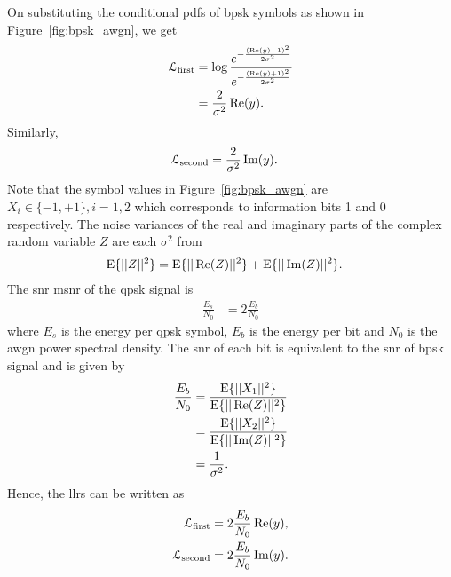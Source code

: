 On substituting the conditional \glspl{pdf} of \gls{bpsk} symbols as shown in Figure~\ref{fig:bpsk_awgn}, we get
\begin{align}
\mathcal{L}_{\text{first}}&=\log\frac{e^{-\frac{(\operatorname{Re}(y)-1)^2}{2\sigma^2}}}{e^{-\frac{(\operatorname{Re}(y)+1)^2}{2\sigma^2}}}\\
&=\frac{2}{\sigma^2}\operatorname{Re}(y)\label{eq:final_llr1}.
\end{align}
Similarly,
\begin{align}
\mathcal{L}_{\text{second}}&=\frac{2}{\sigma^2}\operatorname{Im}(y)\label{eq:final_llr2}.
\end{align}
Note that the symbol values in Figure~\ref{fig:bpsk_awgn} are $X_i\in\{-1,+1\},i=1,2$ which corresponds to information bits 1 and 0 respectively. The noise variances of the real and imaginary parts of the complex random variable $Z$ are each $\sigma^2$ from
\begin{align}
\text{E}\{||Z||^2\}&=\text{E}\{||\operatorname{Re}(Z)||^2\}+\text{E}\{||\operatorname{Im}(Z)||^2\}.
\end{align}
The \gls{snr} \gls{msnr} of the \gls{qpsk} signal is
\begin{align}
\frac{E_s}{N_0}&=2\frac{E_b}{N_0}
\end{align}
where $E_s$ is the energy per \gls{qpsk} symbol, $E_b$ is the energy per bit and $N_0$ is the \gls{awgn} power spectral density. The \gls{snr} of each bit is equivalent to the \gls{snr} of \gls{bpsk} signal and is given by
\begin{align}
\frac{E_b}{N_0}&=\frac{\text{E}\{||X_1||^2\}}{\text{E}\{||\operatorname{Re}(Z)||^2\}}\\
&=\frac{\text{E}\{||X_2||^2\}}{\text{E}\{||\operatorname{Im}(Z)||^2\}}\\
&=\frac{1}{\sigma^2}.
\end{align}
Hence, the \glspl{llr} can be written as
\begin{align}
\mathcal{L}_{\text{first}}&=2\frac{E_b}{N_0}\operatorname{Re}(y),\\
\mathcal{L}_{\text{second}}&=2\frac{E_b}{N_0}\operatorname{Im}(y).
\end{align}

